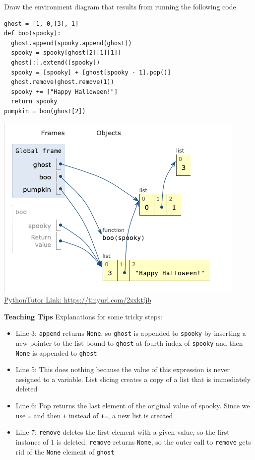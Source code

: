 \begin{blocksection}
\question Draw the environment diagram that results from running the following code.
\begin{lstlisting}
ghost = [1, 0,[3], 1]
def boo(spooky):
  ghost.append(spooky.append(ghost))
  spooky = spooky[ghost[2][1][1]]
  ghost[:].extend([spooky])
  spooky = [spooky] + [ghost[spooky - 1].pop()] 
  ghost.remove(ghost.remove(1))
  spooky += ["Happy Halloween!"]
  return spooky
pumpkin = boo(ghost[2])
\end{lstlisting}

\begin{solution}[1in]
  \includegraphics[width=.5\textwidth]{spooky-list_sol.png}
  \newline
  \href{https://tinyurl.com/2zxktfjb}{PythonTutor Link: https://tinyurl.com/2zxktfjb} 
\end{solution}
\begin{guide}
\textbf{Teaching Tips}
\newline
  Explanations for some tricky steps:
  \begin{itemize}
    \item Line 3: \lstinline{append} returns \lstinline{None}, so \lstinline{ghost} is appended to \lstinline{spooky} by inserting a new pointer to the list bound to \lstinline{ghost} at fourth index of \lstinline{spooky} and then \lstinline{None} is appended to \lstinline{ghost}
    \item Line 5: This does nothing because the value of this expression is never assigned to a variable. List slicing creates a copy of a list that is immediately deleted
    \item Line 6: Pop returns the last element of the original value of spooky. Since we use \lstinline{=} and then \lstinline{+} instead of \lstinline{+=}, a new list is created
    \item Line 7: \lstinline{remove} deletes the first element with a given value, so the first instance of 1 is deleted. \lstinline{remove} returns \lstinline{None}, so the outer call to \lstinline{remove} gets rid of the \lstinline{None} element of \lstinline{ghost}

\end{itemize}
\end{guide}
\end{blocksection}
